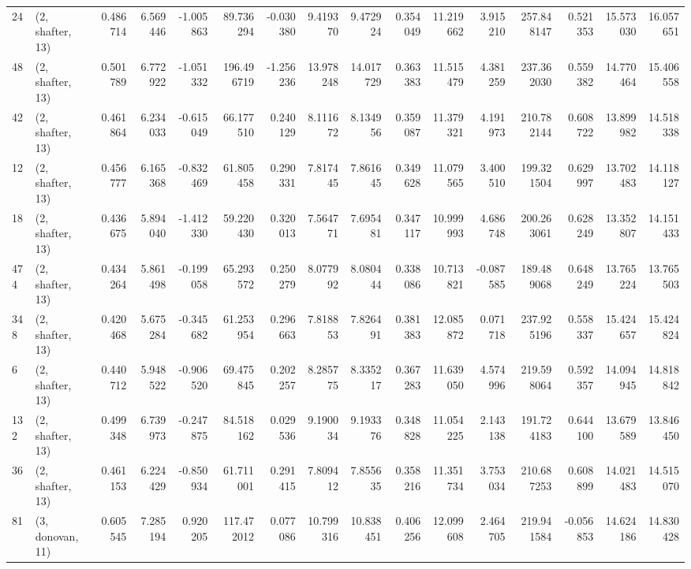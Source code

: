 \begin{tabular}{llrrrrrrrrrrrrrr}
24  &  (2, shafter, 13) &   0.486714 &   6.569446 &  -1.005863 &    89.736294 &  -0.030380 &   9.419370 &   9.472924 &  0.354049 &  11.219662 &   3.915210 &   257.848147 &  0.521353 &  15.573030 &  16.057651 \\
48  &  (2, shafter, 13) &   0.501789 &   6.772922 &  -1.051332 &   196.496719 &  -1.256236 &  13.978248 &  14.017729 &  0.363383 &  11.515479 &   4.381259 &   237.362030 &  0.559382 &  14.770464 &  15.406558 \\
42  &  (2, shafter, 13) &   0.461864 &   6.234033 &  -0.615049 &    66.177510 &   0.240129 &   8.111672 &   8.134956 &  0.359087 &  11.379321 &   4.191973 &   210.782144 &  0.608722 &  13.899982 &  14.518338 \\
12  &  (2, shafter, 13) &   0.456777 &   6.165368 &  -0.832469 &    61.805458 &   0.290331 &   7.817445 &   7.861645 &  0.349628 &  11.079565 &   3.400510 &   199.321504 &  0.629997 &  13.702483 &  14.118127 \\
18  &  (2, shafter, 13) &   0.436675 &   5.894040 &  -1.412330 &    59.220430 &   0.320013 &   7.564771 &   7.695481 &  0.347117 &  10.999993 &   4.686748 &   200.263061 &  0.628249 &  13.352807 &  14.151433 \\
474 &  (2, shafter, 13) &   0.434264 &   5.861498 &  -0.199058 &    65.293572 &   0.250279 &   8.077992 &   8.080444 &  0.338086 &  10.713821 &  -0.087585 &   189.489068 &  0.648249 &  13.765224 &  13.765503 \\
348 &  (2, shafter, 13) &   0.420468 &   5.675284 &  -0.345682 &    61.253954 &   0.296663 &   7.818853 &   7.826491 &  0.381383 &  12.085872 &   0.071718 &   237.925196 &  0.558337 &  15.424657 &  15.424824 \\
6   &  (2, shafter, 13) &   0.440712 &   5.948522 &  -0.906520 &    69.475845 &   0.202257 &   8.285775 &   8.335217 &  0.367283 &  11.639050 &   4.574996 &   219.598064 &  0.592357 &  14.094945 &  14.818842 \\
132 &  (2, shafter, 13) &   0.499348 &   6.739973 &  -0.247875 &    84.518162 &   0.029536 &   9.190034 &   9.193376 &  0.348828 &  11.054225 &   2.143138 &   191.724183 &  0.644100 &  13.679589 &  13.846450 \\
36  &  (2, shafter, 13) &   0.461153 &   6.224429 &  -0.850934 &    61.711001 &   0.291415 &   7.809412 &   7.855635 &  0.358216 &  11.351734 &   3.753034 &   210.687253 &  0.608899 &  14.021483 &  14.515070 \\
81  &  (3, donovan, 11) &   0.605545 &   7.285194 &   0.920205 &   117.472012 &   0.077086 &  10.799316 &  10.838451 &  0.406256 &  12.099608 &   2.464705 &   219.941584 & -0.056853 &  14.624186 &  14.830428 \\

\end{tabular}
